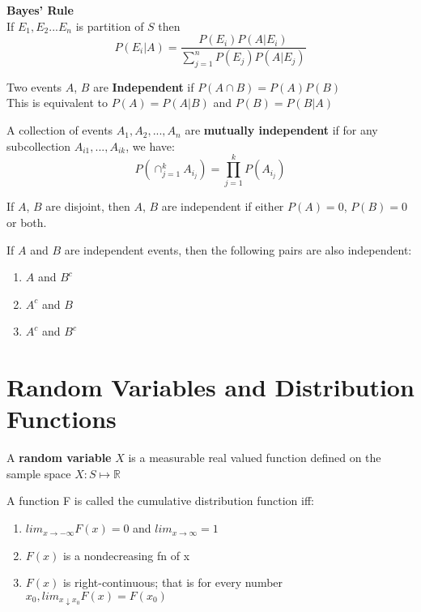 \documentclass[14pt, oneside, letterpaper]{notes}
\begin{document}
%
%

\begin{mydef}
	\textbf{Bayes' Rule} \\
	If ${E_1, E_2 ... E_n}$ is partition of $S$ then \\
	\[ P(E_i|A) = \frac{P(E_i)P(A|E_i)}
	{\sum_{j=1}^{n}P(E_j)P(A|E_j)} \]
\end{mydef}

\begin{mydef}
	Two events $A$, $B$ are \textbf{Independent} if
	$P(A \cap B) = P(A)P(B)$ \\
	This is equivalent to $P(A) = P(A|B)$ and 
	$P(B) = P(B|A)$
\end{mydef}

\begin{mydef}
	A collection of events $A_1, A_2, ..., A_n$ are 
	\textbf{mutually independent} if for any subcollection
	$A_{i1}, ..., A_{ik}$, we have:
	\[ P(\cap_{j=1}^k A_{i_j}) = \prod_{j=1}^k P(A_{i_j}) \]
\end{mydef}

\begin{remark}
	If $A$, $B$ are disjoint, then $A$, $B$ are independent if
	either $P(A)=0$, $P(B)=0$ or both.
\end{remark}

\begin{remark}
	If $A$ and $B$ are independent events, then the 
	following pairs are also independent:
	\begin{enumerate}
		\item $A$ and $B^c$
		\item $A^c$ and $B$
		\item $A^c$ and $B^c$
	\end{enumerate}
\end{remark}


%
%

\section*{Random Variables and Distribution Functions}

\begin{mydef}
	A \textbf{random variable} $X$ is a measurable real 
	valued function defined on the sample space 
	$X : S \mapsto \mathbb{R}$
\end{mydef}

\begin{mydef}
	A function F is called the cumulative distribution
	function iff: 
	\begin{enumerate}
	\item $lim_{x \to -\infty}F(x)=0$ and $lim_{x \to \infty}=1$
	\item $F(x)$ is a nondecreasing fn of x
	\item $F(x)$ is right-continuous; that is for every number 
	$x_0, lim_{x \downarrow x_0} F(x) = F(x_0)$
	\end{enumerate}
\end{mydef}
\end{document}
